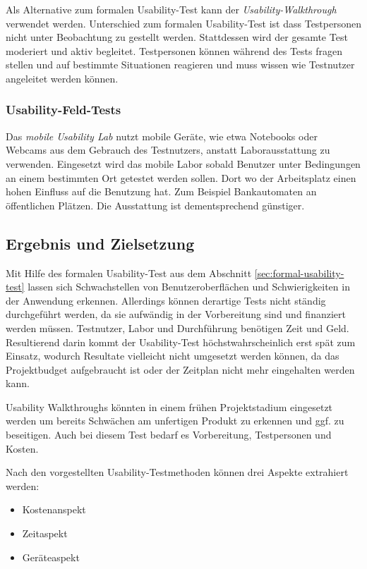 Als Alternative zum formalen Usability-Test kann der \textit{Usability-Walkthrough} verwendet werden. Unterschied zum formalen Usability-Test ist dass Testpersonen nicht unter Beobachtung zu gestellt werden. Stattdessen wird der gesamte Test moderiert und aktiv begleitet. Testpersonen können während des Tests fragen stellen und auf bestimmte Situationen reagieren und muss wissen wie Testnutzer angeleitet werden können.

\subsubsection{Usability-Feld-Tests}

Das \textit{mobile Usability Lab} nutzt mobile Geräte, wie etwa Notebooks oder Webcams aus dem Gebrauch des Testnutzers, anstatt Laborausstattung zu verwenden. Eingesetzt wird das mobile Labor sobald Benutzer unter Bedingungen an einem bestimmten Ort getestet werden sollen. Dort wo der Arbeitsplatz einen hohen Einfluss auf die Benutzung hat. Zum Beispiel Bankautomaten an öffentlichen Plätzen. Die Ausstattung ist dementsprechend günstiger. 

\cite{usabilityblog_wasBeachten}

\cite{usabilityblog_eResult}

\subsection{Ergebnis und Zielsetzung}

Mit Hilfe des formalen Usability-Test aus dem Abschnitt \ref{sec:formal-usability-test} lassen sich Schwachstellen von Benutzeroberflächen und Schwierigkeiten in der Anwendung erkennen. Allerdings können derartige Tests nicht ständig durchgeführt werden, da sie aufwändig in der Vorbereitung sind und finanziert werden müssen. Testnutzer, Labor und Durchführung benötigen Zeit und Geld. Resultierend darin kommt der Usability-Test höchstwahrscheinlich erst spät zum Einsatz, wodurch Resultate vielleicht nicht umgesetzt werden können, da das Projektbudget aufgebraucht ist oder der Zeitplan nicht mehr eingehalten werden kann. 

Usability Walkthroughs könnten in einem frühen Projektstadium eingesetzt werden um bereits Schwächen am unfertigen Produkt zu erkennen und ggf. zu beseitigen. Auch bei diesem Test bedarf es Vorbereitung, Testpersonen und Kosten.


Nach den vorgestellten Usability-Testmethoden können drei Aspekte extrahiert werden: 
\begin{itemize}
	\item{Kostenanspekt}
	\item{Zeitaspekt}
	\item{Geräteaspekt}
\end{itemize}

